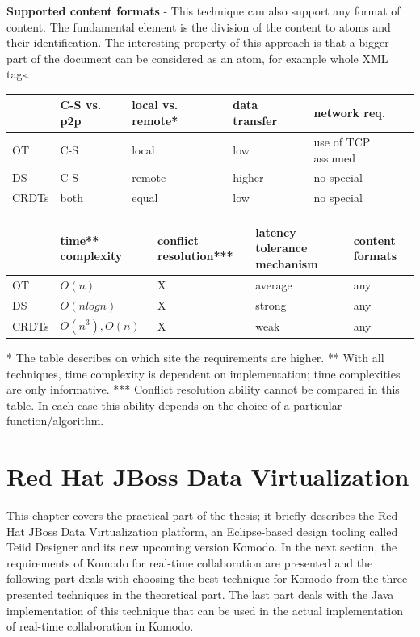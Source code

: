 \documentclass[12pt,oneside]{fithesis2}
\begin{document}
\vspace{3mm} 

\textbf{Supported content formats} - This technique can also support any format of content. The fundamental element is the division of the content to atoms and their identification. The interesting property of this approach is that a bigger part of the document can be considered as an atom, for example whole XML tags.

\vspace{13mm} 
\newpage
\noindent
\begin{tabular}{| p{1.7cm} | p{2.2cm} | p{2.2cm} | p{2.2cm} | p{2.2cm} |}
\hline
 & C-S vs. p2p & local vs. remote* & data \newline transfer & network req.  \\
\hline
OT & C-S & local & low & use of TCP assumed \\
\hline
DS & C-S & remote & higher & no special \\
\hline
CRDTs & both & equal & low & no special \\
\hline
\end{tabular}
\newline
\vspace*{1 cm}
\newline
\begin{tabular}{| p{1.7cm} | p{2.2cm} | p{2.2cm} | p{2.2cm} | p{2.2cm} |}
\hline
 & time** \newline complexity & conflict resolution*** & latency tolerance  mechanism & content formats \\
\hline
OT &  \(O(n)\) & X & average  & any \\
\hline
DS & \(O(nlogn)\) & X & strong  & any \\
\hline
CRDTs & \(O(n^3), O(n)\) & X & weak  & any \\
\hline
\end{tabular}
\vspace{10mm}
\newline
* The table describes on which site the requirements are higher. \newline
** With all techniques, time complexity is dependent on implementation; time complexities are only informative. \newline
*** Conflict resolution ability cannot be compared in this table. In each case this ability depends on the choice of a particular function/algorithm.
\chapter{Red Hat JBoss Data Virtualization}
\par This chapter covers the practical part of the thesis; it briefly describes the Red Hat JBoss Data Virtualization platform, an Eclipse-based design tooling called Teiid Designer and its new upcoming version Komodo. In the next section, the requirements of Komodo for real-time collaboration are presented and the following part deals with choosing the best technique for Komodo from the three presented techniques in the theoretical part. The last part deals with the Java implementation of this technique that can be used in the actual implementation of real-time collaboration in Komodo.
\end{document}
